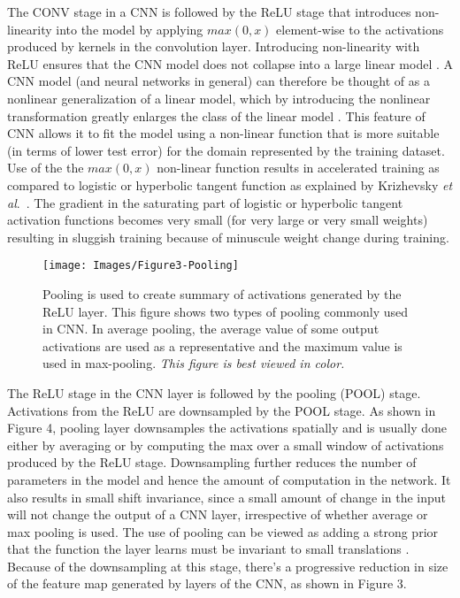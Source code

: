 \documentclass [11pt,letterpaper ,openany ]{report}
\begin{document}
    The CONV stage in a CNN is followed by the ReLU stage that introduces non-linearity into the model by applying \(max (0,x)\) element-wise to the activations produced by kernels in the convolution layer. Introducing non-linearity with ReLU ensures that the CNN model does not collapse into a large linear model \cite{hastie-et-al-2014, hastie-et-al-2008, Murphy2012}. A CNN model (and neural networks in general) can therefore be thought of as a nonlinear generalization of a linear model, which by introducing the nonlinear transformation greatly enlarges the class of the linear model \cite{hastie-et-al-2008}. This feature of CNN allows it to fit the model using a non-linear function that is more suitable (in terms of lower test error) for the domain represented by the training dataset. Use of the the \(max (0,x)\) non-linear function results in accelerated training as compared to logistic or hyperbolic tangent function as explained by Krizhevsky \textit{et al}.\ \cite{krizhevsky2012imagenet}. The gradient in the saturating part of logistic or hyperbolic tangent activation functions becomes very small (for very large or very small weights) resulting in sluggish training because of minuscule weight change during training.

    \begin{wrapfigure}{r}{0.5\textwidth}
        \begin{center}
            \texttt{[image: Images/Figure3-Pooling]}
        \end{center}
        \caption{Pooling is used to create summary of activations generated by the ReLU layer. This figure shows two types of pooling commonly used in CNN. In average pooling, the average value of some output activations are used as a representative and the maximum value is used in max-pooling. \textit{This figure is best viewed in color.}}
    \end{wrapfigure}    

    The ReLU stage in the CNN layer is followed by the pooling (POOL) stage. Activations from the ReLU are downsampled by the POOL stage. As shown in Figure 4, pooling layer downsamples the activations spatially and is usually done either by averaging or by computing the max over a small window of activations produced by the ReLU stage. Downsampling further reduces the number of parameters in the model and hence the amount of computation in the network. It also results in small shift invariance, since a small amount of change in the input will not change the output of a CNN layer, irrespective of whether average or max pooling is used. The use of pooling can be viewed as adding a strong prior that the function the layer learns must be invariant to small translations \cite{Goodfellow-et-al-2016}. Because of the downsampling at this stage, there's a progressive reduction in size of the feature map generated by layers of the CNN, as shown in Figure 3. \\ 
\end{document}
